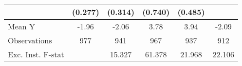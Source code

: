{\begin{tabular}{l*{5}{c}}
            &     (0.277)         &     (0.314)         &     (0.740)         &     (0.485)         &                     \\
\midrule
Mean Y      &       -1.96         &       -2.06         &        3.78         &        3.94         &       -2.09         \\
Observations&         977         &         941         &         967         &         937         &         912         \\
Exc. Inst. F-stat&                     &      15.327         &      61.378         &      21.968         &      22.106         \\
\bottomrule
\end{tabular}
}
